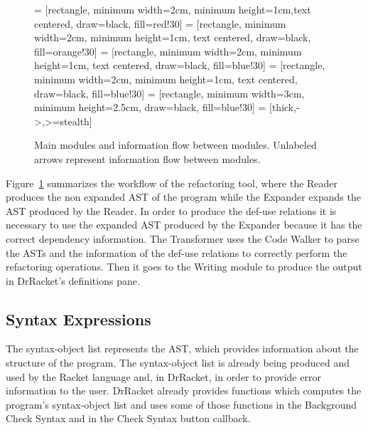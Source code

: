 \begin{figure}
\centering
{} = [rectangle,  minimum width=2cm, minimum height=1cm,text centered, draw=black, fill=red!30] %
 = [rectangle,  minimum width=2cm, minimum height=1cm, text centered, draw=black, fill=orange!30] %
 = [rectangle,  minimum width=2cm, minimum height=1cm, text centered, draw=black, fill=blue!30]
 = [rectangle,  minimum width=2cm, minimum height=1cm, text centered, draw=black, fill=blue!30]
 = [rectangle,  minimum width=3cm, minimum height=2.5cm, draw=black, fill=blue!30]
 = [thick,->,>=stealth]
\caption{Main modules and information flow between modules. Unlabeled arrows represent information
flow between modules.}
\label{flow-chart}
\end{figure}

Figure~\ref{flow-chart} summarizes the workflow of the refactoring
tool, where the Reader produces the non expanded AST of the program
while the Expander expands the AST produced by the Reader.  In order
to produce the def-use relations it is necessary to use the expanded
AST produced by the Expander because it has the correct dependency
information.  The Transformer uses the Code Walker to parse the ASTs
and the information of the def-use relations to correctly perform the
refactoring operations.  Then it goes to the Writing module to produce
the output in DrRacket's definitions pane. \\


\subsection{Syntax Expressions}
The syntax-object list represents the AST, which provides information
about the structure of the program.  The syntax-object list is already
being produced and used by the Racket language and, in DrRacket, in
order to provide error information to the user.  DrRacket already
provides functions which computes the program's syntax-object list and
uses some of those functions in the Background Check Syntax and in the
Check Syntax button callback.


